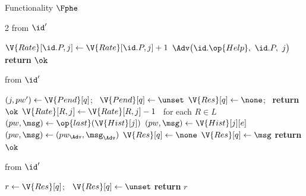 \begin{interface}[nofloat]{Functionality $\Fphe$ \\
}
{\begin{multicols}{2}
 \quad from $\id'$
\begin{algorithmic}[1]
\algcont
{}
  \State $\V{Rate}[\id.P, j] \gets \V{Rate}[\id.P, j] + 1$ \label{ln:phequota}
\EndIf
\State $\Adv\bigl(\id.\op{Help},\ \id.P,\ j\bigr)$
\State \textbf{return} $\ok$
\algsave
\end{algorithmic}
\vspace{1.4ex}

 \quad from $\id'$
\begin{algorithmic}[1]
\algcont
{}
\State $(j, pw') \gets \V{Pend}[q]$; \ $\V{Pend}[q] \gets \unset$
  \State $\V{Res}[q] \gets \none$; \ \textbf{return} $\ok$ \label{ln:phefail}
\EndIf
{} \label{ln:phethresh}
 \label{ln:phespend}
\State $\V{Rate}[R, j] \gets \V{Rate}[R, j] - 1$ \ for each $R \in L$
\State $(pw, \msg) \gets \op{last}(\V{Hist}[j])$ \label{ln:phemostrecent}
  \State $(pw, \msg) \gets \V{Hist}[j][e]$ \label{ln:pherollback}
\EndIf
{}
  \State $(pw, \msg) \gets (pw_{\Adv}, \msg_{\Adv})$ \label{ln:pheinject}
\EndIf
\State $\V{Res}[q] \gets \none$
  \State $\V{Res}[q] \gets \msg$ \label{ln:phecheck}
\EndIf
\State \textbf{return} $\ok$
\algsave
\end{algorithmic}
\vspace{1.4ex}

\columnbreak

 \quad from $\id'$
\begin{algorithmic}[1]
\algcont
{}
\State $r \gets \V{Res}[q]$; \ $\V{Res}[q] \gets \unset$
\State \textbf{return} $r$
\algsave
\end{algorithmic}
\vspace{1.4ex}


\end{multicols}}
\end{interface}
